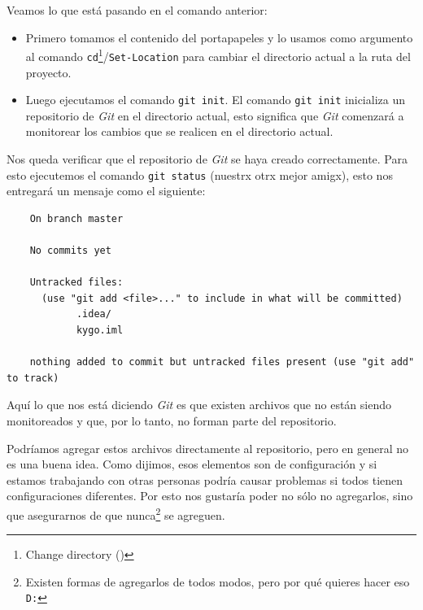   \begin{defaultbox}[MacOS]
  \end{defaultbox}

  Veamos lo que está pasando en el comando anterior:
  \begin{itemize}
    \item Primero tomamos el contenido del portapapeles y lo usamos como argumento al comando 
      \texttt{cd}\footnote{Change directory (\cite{CdManPage})}/\texttt{Set-Location}\autocite{sdwheelerSetLocationMicrosoftPowerShell} 
      para cambiar el directorio actual a la ruta del proyecto.
    \item Luego ejecutamos el comando \texttt{git init}.
      El comando \texttt{git init} inicializa un repositorio de \textit{Git} en el directorio
      actual, esto significa que \textit{Git} comenzará a monitorear los cambios que se realicen
      en el directorio actual.
  \end{itemize}

  Nos queda verificar que el repositorio de \textit{Git} se haya creado correctamente.
  Para esto ejecutemos el comando \texttt{git status} (nuestrx otrx mejor amigx), 
  esto nos entregará un mensaje como el siguiente:

  \begin{verbatim}
    On branch master

    No commits yet

    Untracked files:
      (use "git add <file>..." to include in what will be committed)
            .idea/
            kygo.iml

    nothing added to commit but untracked files present (use "git add" to track)
  \end{verbatim}

  Aquí lo que nos está diciendo \textit{Git} es que existen archivos que no están siendo 
  monitoreados y que, por lo tanto, no forman parte del repositorio.

  Podríamos agregar estos archivos directamente al repositorio, pero en general no es una buena 
  idea.
  Como dijimos, esos elementos son de configuración y si estamos trabajando con otras personas
  podría causar problemas si todos tienen configuraciones diferentes.
  Por esto nos gustaría poder no sólo no agregarlos, sino que asegurarnos de que nunca\footnote{
    Existen formas de agregarlos de todos modos, pero por qué quieres hacer eso \texttt{D:}
  } se agreguen.


